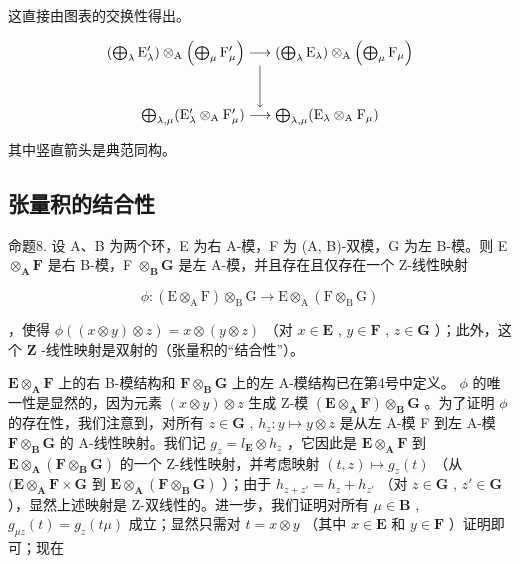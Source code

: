 这直接由图表的交换性得出。

\[
\begin{array}{c} \left(\bigoplus_ {\lambda} \mathrm{E} _ {\lambda} ^ {\prime}\right) \otimes_ {\mathrm{A}} \left(\bigoplus_ {\mu} \mathrm{F} _ {\mu} ^ {\prime}\right) \longrightarrow \left(\bigoplus_ {\lambda} \mathrm{E} _ {\lambda}\right) \otimes_ {\mathrm{A}} \left(\bigoplus_ {\mu} \mathrm{F} _ {\mu}\right) \\ \Biggl \downarrow \\ \bigoplus_ {\lambda , \mu} (\mathrm{E} _ {\lambda} ^ {\prime} \otimes_ {\mathrm{A}} \mathrm{F} _ {\mu} ^ {\prime}) \longrightarrow \bigoplus_ {\lambda , \mu} (\mathrm{E} _ {\lambda} \otimes_ {\mathrm{A}} \mathrm{F} _ {\mu}) \end{array}
\]

其中竖直箭头是典范同构。

\subsection{张量积的结合性}

命题8. 设 A、B 为两个环，E 为右 A-模，F 为 (A, B)-双模，G 为左 B-模。则 E \(\otimes_{\mathbf{A}} \mathbf{F}\) 是右 B-模，F \(\otimes_{\mathbf{B}} \mathbf{G}\) 是左 A-模，并且存在且仅存在一个 Z-线性映射

\[
\phi : (\mathrm{E} \otimes_ {\mathrm{A}} \mathrm{F}) \otimes_ {\mathrm{B}} \mathrm{G} \rightarrow \mathrm{E} \otimes_ {\mathrm{A}} (\mathrm{F} \otimes_ {\mathrm{B}} \mathrm{G})
\]

，使得 \(\phi((x \otimes y) \otimes z) = x \otimes (y \otimes z)\) （对 \(x \in \mathbf{E}\) , \(y \in \mathbf{F}\) , \(z \in \mathbf{G}\) ）；此外，这个 \(\mathbf{Z}\) -线性映射是双射的（张量积的“结合性”）。

\(\mathbf{E} \otimes_{\mathbf{A}} \mathbf{F}\) 上的右 B-模结构和 \(\mathbf{F} \otimes_{\mathbf{B}} \mathbf{G}\) 上的左 A-模结构已在第4号中定义。 \(\phi\) 的唯一性是显然的，因为元素 \((x \otimes y) \otimes z\) 生成 Z-模 \((\mathbf{E} \otimes_{\mathbf{A}} \mathbf{F}) \otimes_{\mathbf{B}} \mathbf{G}\) 。为了证明 \(\phi\) 的存在性，我们注意到，对所有 \(z \in \mathbf{G}\) , \(h_z: y \mapsto y \otimes z\) 是从左 A-模 F 到左 A-模 \(\mathbf{F} \otimes_{\mathbf{B}} \mathbf{G}\) 的 A-线性映射。我们记 \(g_z = l_{\mathbf{E}} \otimes h_z\) ，它因此是 \(\mathbf{E} \otimes_{\mathbf{A}} \mathbf{F}\) 到 \(\mathbf{E} \otimes_{\mathbf{A}} (\mathbf{F} \otimes_{\mathbf{B}} \mathbf{G})\) 的一个 Z-线性映射，并考虑映射 \((t, z) \mapsto g_z(t)\) （从 \((\mathbf{E} \otimes_{\mathbf{A}} \mathbf{F} \times \mathbf{G}\) 到 \(\mathbf{E} \otimes_{\mathbf{A}} (\mathbf{F} \otimes_{\mathbf{B}} \mathbf{G})\) ）；由于 \(h_{z+z'} = h_z + h_{z'}\) （对 \(z \in \mathbf{G}\) , \(z' \in \mathbf{G}\) ），显然上述映射是 Z-双线性的。进一步，我们证明对所有 \(\mu \in \mathbf{B}\) , \(g_{\mu z}(t) = g_z(t\mu)\) 成立；显然只需对 \(t = x \otimes y\) （其中 \(x \in \mathbf{E}\) 和 \(y \in \mathbf{F}\) ）证明即可；现在

